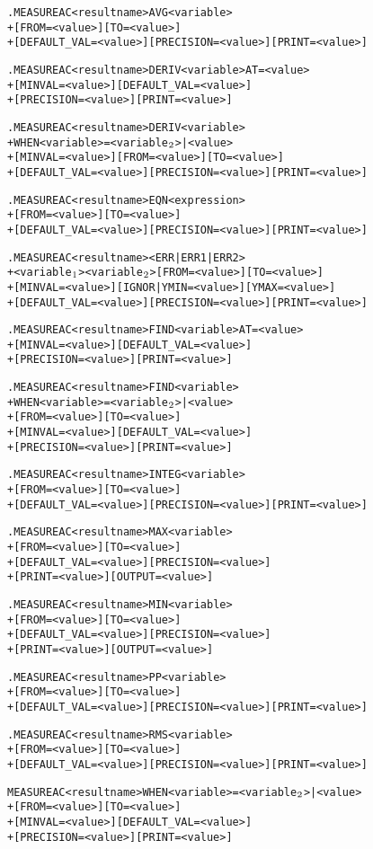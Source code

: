 \begin{Command}
\begin{alltt}
.MEASURE AC <result name> AVG <variable>
+ [FROM=<value>] [TO=<value>]
+ [DEFAULT_VAL=<value>] [PRECISION=<value>] [PRINT=<value>]

.MEASURE AC <result name> DERIV <variable> AT=<value>
+ [MINVAL=<value>] [DEFAULT_VAL=<value>]
+ [PRECISION=<value>] [PRINT=<value>]

.MEASURE AC <result name> DERIV <variable>
+ WHEN <variable>=<variable\(\sb{2}\)>|<value>
+ [MINVAL=<value>] [FROM=<value>] [TO=<value>]
+ [DEFAULT_VAL=<value>] [PRECISION=<value>] [PRINT=<value>]

.MEASURE AC <result name> EQN <expression> 
+ [FROM=<value>] [TO=<value>] 
+ [DEFAULT_VAL=<value>] [PRECISION=<value>] [PRINT=<value>]

.MEASURE AC <result name> <ERR|ERR1|ERR2>
+ <variable\(\sb{1}\)> <variable\(\sb{2}\)> [FROM=<value>] [TO=<value>]
+ [MINVAL=<value>] [IGNOR|YMIN=<value>] [YMAX=<value>]
+ [DEFAULT_VAL=<value>] [PRECISION=<value>] [PRINT=<value>]

.MEASURE AC <result name> FIND <variable> AT=<value>
+ [MINVAL=<value>] [DEFAULT_VAL=<value>]
+ [PRECISION=<value>] [PRINT=<value>]

.MEASURE AC <result name> FIND <variable>
+ WHEN <variable>=<variable\(\sb{2}\)>|<value>
+ [FROM=<value>] [TO=<value>]
+ [MINVAL=<value>] [DEFAULT_VAL=<value>]
+ [PRECISION=<value>] [PRINT=<value>]

.MEASURE AC <result name> INTEG <variable>
+ [FROM=<value>] [TO=<value>]
+ [DEFAULT_VAL=<value>] [PRECISION=<value>] [PRINT=<value>]

.MEASURE AC <result name> MAX <variable>
+ [FROM=<value>] [TO=<value>] 
+ [DEFAULT_VAL=<value>] [PRECISION=<value>] 
+ [PRINT=<value>] [OUTPUT=<value>]

.MEASURE AC <result name> MIN <variable>
+ [FROM=<value>] [TO=<value>] 
+ [DEFAULT_VAL=<value>] [PRECISION=<value>]
+ [PRINT=<value>] [OUTPUT=<value>]

.MEASURE AC <result name> PP <variable>
+ [FROM=<value>] [TO=<value>] 
+ [DEFAULT_VAL=<value>] [PRECISION=<value>] [PRINT=<value>]

.MEASURE AC <result name> RMS <variable>
+ [FROM=<value>] [TO=<value>]
+ [DEFAULT_VAL=<value>] [PRECISION=<value>] [PRINT=<value>]

MEASURE AC <result name> WHEN <variable>=<variable\(\sb{2}\)>|<value>
+ [FROM=<value>] [TO=<value>]
+ [MINVAL=<value>] [DEFAULT_VAL=<value>]
+ [PRECISION=<value>] [PRINT=<value>]

\end{alltt}


\end{Command}

